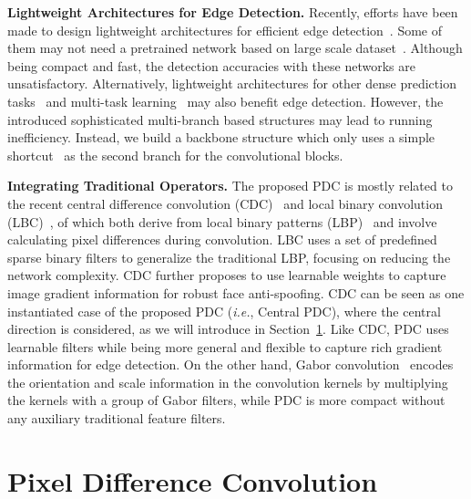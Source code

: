 \documentclass[10pt,twocolumn,letterpaper]{article}
\begin{document}
\vspace{0.3em}
\noindent \textbf{Lightweight Architectures for Edge Detection.} \quad Recently, efforts have been made to design lightweight architectures for efficient edge detection~\cite{wibisono2020fined,wibisono2020traditional,poma2020dense}. Some of them may not need a pretrained network based on large scale dataset~\cite{poma2020dense}. Although being compact and fast, the detection accuracies with these networks are unsatisfactory. Alternatively, lightweight architectures for other dense prediction tasks~\cite{gao2020100k,wu2020cgnet,paszke2016enet,li2019dabnet,mehta2019espnetv2,yu2018bisenet} and multi-task learning~\cite{kokkinos2017ubernet, liu2020dynamicintegration} may also benefit edge detection. However, the introduced sophisticated multi-branch based structures may lead to running inefficiency. Instead, we build a backbone structure which only uses a simple shortcut~\cite{he2016residual} as the second branch for the convolutional blocks.

\vspace{0.3em}
\noindent \textbf{Integrating Traditional Operators.}  \quad The proposed PDC is mostly related to the recent central difference convolution (CDC)~\cite{yu2020cdc,yu2020fas,yu2021dual,yu2021searching} and local binary convolution (LBC)~\cite{juefei2017lbc}, of which both derive from local binary patterns (LBP)~\cite{ojala2002lbp} and involve calculating pixel differences during convolution. LBC uses a set of predefined sparse binary filters to generalize the traditional LBP, focusing on reducing the network complexity. CDC further proposes to use learnable weights to capture image gradient information for robust face anti-spoofing. CDC can be seen as one instantiated case of the proposed PDC (\emph{i.e.}, Central PDC), where the central direction is considered, as we will introduce in Section~\ref{sec:pdc}. Like CDC, PDC uses learnable filters while being more general and flexible to capture rich gradient information for edge detection. On the other hand, Gabor convolution~\cite{luan2018gabor} encodes the orientation and scale information in the convolution kernels by multiplying the kernels with a group of Gabor filters, while PDC is more compact without any auxiliary traditional feature filters.


\section{Pixel Difference Convolution}
\label{sec:pdc}
\end{document}
